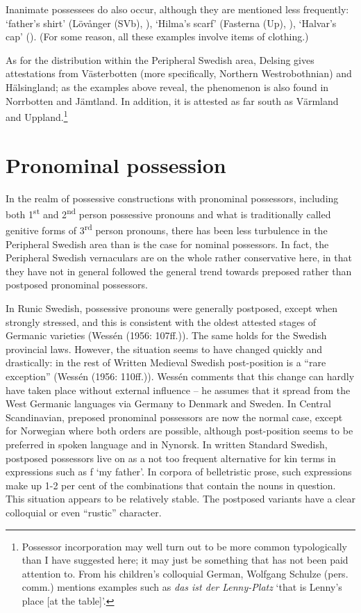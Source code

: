 {{{{{{{{Inanimate possessees do also occur, although they are mentioned less frequently:  ‘father’s shirt’ (Lövånger (SVb), \citet{Holm1942}),  ‘Hilma’s scarf’ (Fasterna (Up), \citet[134]{Tiselius1902}),  ‘Halvar’s cap’ (\citet{Oscarsson2007}). (For some reason, all these examples involve items of clothing.)

As for the distribution within the Peripheral Swedish area, Delsing gives attestations from Västerbotten (more specifically, Northern Westrobothnian) and Hälsingland; as the examples above reveal, the phenomenon is also found in Norrbotten and Jämtland. In addition, it is attested as far south as Värmland and Uppland.\footnote{ Possessor incorporation may well turn out to be more common typologically than I have suggested here; it may just be something that has not been paid attention to. From his children’s colloquial German, Wolfgang Schulze (pers. comm.) mentions examples such as \textit{das ist der Lenny-Platz} ‘that is Lenny’s place [at the table]’.\par }

\section{Pronominal possession}

In the realm of possessive constructions with pronominal possessors, including both 1\textsuperscript{st} and 2\textsuperscript{nd} person possessive pronouns and what is traditionally called genitive forms of 3\textsuperscript{rd} person pronouns, there has been less turbulence in the Peripheral Swedish area than is the case for nominal possessors. In fact, the Peripheral Swedish vernaculars are on the whole rather conservative here, in that they have not in general followed the general trend towards preposed rather than postposed pronominal possessors. 

In Runic Swedish, possessive pronouns were generally postposed, except when strongly stressed, and this is consistent with the oldest attested stages of Germanic varieties (Wessén (1956: 107ff.)). The same holds for the Swedish provincial laws. However, the situation seems to have changed quickly and drastically: in the rest of Written Medieval Swedish post-position is a “rare exception” (Wessén (1956: 110ff.)). Wessén comments that this change can hardly have taken place without external influence – he assumes that it spread from the West Germanic languages via Germany to Denmark and Sweden. In Central Scandinavian, preposed pronominal possessors are now the normal case, except for Norwegian where both orders are possible, although post-position seems to be preferred in spoken language and in Nynorsk. In written Standard Swedish, postposed possessors live on as a not too frequent alternative for kin terms in expressions such as f ‘my father’. In corpora of belletristic prose, such expressions make up 1-2 per cent of the combinations that contain the nouns in question. This situation appears to be relatively stable. The postposed variants have a clear colloquial or even “rustic” character. 

}}}}}}}}
